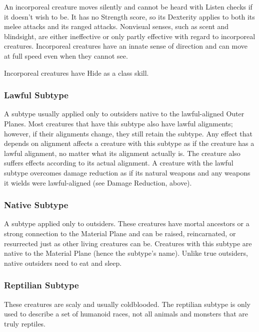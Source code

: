 {An incorporeal creature moves silently and cannot be heard with Listen checks if it doesn't wish to be. It has no Strength score, so its Dexterity applies to both its melee attacks and its ranged attacks. Nonvisual senses, such as scent and blindsight, are either ineffective or only partly effective with regard to incorporeal creatures. Incorporeal creatures have an innate sense of direction and can move at full speed even when they cannot see.

Incorporeal creatures have Hide as a class skill.

\subsubsection{Lawful Subtype} A subtype usually applied only to outsiders native to the lawful-aligned Outer Planes. Most creatures that have this subtype also have lawful alignments; however, if their alignments change, they still retain the subtype. Any effect that depends on alignment affects a creature with this subtype as if the creature has a lawful alignment, no matter what its alignment actually is. The creature also suffers effects according to its actual alignment. A creature with the lawful subtype overcomes damage reduction as if its natural weapons and any weapons it wields were lawful-aligned (see Damage Reduction, above).

\subsubsection{Native Subtype} A subtype applied only to outsiders. These creatures have mortal ancestors or a strong connection to the Material Plane and can be raised, reincarnated, or resurrected just as other living creatures can be. Creatures with this subtype are native to the Material Plane (hence the subtype's name). Unlike true outsiders, native outsiders need to eat and sleep. 

\subsubsection{Reptilian Subtype} These creatures are scaly and usually coldblooded. The reptilian subtype is only used to describe a set of humanoid races, not all animals and monsters that are truly reptiles.

}
